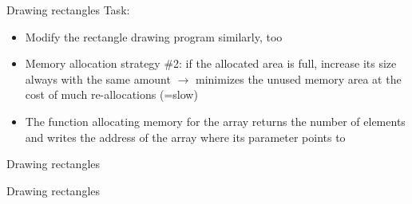 \documentclass[usenames,dvipsnames,aspectratio=169]{beamer}
\begin{document}
\begin{frame}{Drawing rectangles}
  Task:
  \begin{itemize}
    \item Modify the rectangle drawing program similarly, too
    \item Memory allocation strategy \#2: if the allocated area is full, increase its size always with the same amount $\to$ minimizes the unused memory area at the cost of much re-allocations (=slow)
    \item The function allocating memory for the array returns the number of elements and writes the address of the array where its parameter points to
  \end{itemize}
  \begin{exampleblock}{}
    \scriptsize
    \vspace{-.3cm}
    
    \vspace{-.3cm}
  \end{exampleblock}
\end{frame}

\begin{frame}{Drawing rectangles}
  \begin{exampleblock}{}
    \footnotesize
    \vspace{-.3cm}
    
    \vspace{-.3cm}
  \end{exampleblock}
\end{frame}

\begin{frame}{Drawing rectangles}
  \begin{exampleblock}{}
    \scriptsize
    
  \end{exampleblock}
\end{frame}
\end{document}
